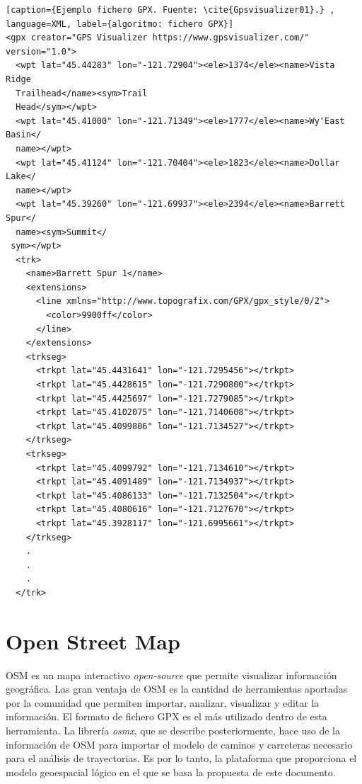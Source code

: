 \begin{lstlisting}[caption={Ejemplo fichero GPX. Fuente: \cite{Gpsvisualizer01}.} , 
language=XML, label={algoritmo: fichero GPX}]
<gpx creator="GPS Visualizer https://www.gpsvisualizer.com/" version="1.0">
  <wpt lat="45.44283" lon="-121.72904"><ele>1374</ele><name>Vista Ridge 
  Trailhead</name><sym>Trail 
  Head</sym></wpt>
  <wpt lat="45.41000" lon="-121.71349"><ele>1777</ele><name>Wy'East Basin</
  name></wpt>
  <wpt lat="45.41124" lon="-121.70404"><ele>1823</ele><name>Dollar Lake</
  name></wpt>
  <wpt lat="45.39260" lon="-121.69937"><ele>2394</ele><name>Barrett Spur</
  name><sym>Summit</
 sym></wpt>
  <trk>
    <name>Barrett Spur 1</name>
    <extensions>
      <line xmlns="http://www.topografix.com/GPX/gpx_style/0/2">
        <color>9900ff</color>
      </line>
    </extensions>
    <trkseg>
      <trkpt lat="45.4431641" lon="-121.7295456"></trkpt>
      <trkpt lat="45.4428615" lon="-121.7290800"></trkpt>
      <trkpt lat="45.4425697" lon="-121.7279085"></trkpt>
      <trkpt lat="45.4102075" lon="-121.7140608"></trkpt>
      <trkpt lat="45.4099806" lon="-121.7134527"></trkpt>
    </trkseg>
    <trkseg>
      <trkpt lat="45.4099792" lon="-121.7134610"></trkpt>
      <trkpt lat="45.4091489" lon="-121.7134937"></trkpt>
      <trkpt lat="45.4086133" lon="-121.7132504"></trkpt>
      <trkpt lat="45.4080616" lon="-121.7127670"></trkpt>
      <trkpt lat="45.3928117" lon="-121.6995661"></trkpt>
    </trkseg>
    .
    .
    .
  </trk>

\end{lstlisting}

\section{Open Street Map}
\ac{OSM} es un mapa interactivo \textit{open-source} que permite visualizar 
información geográfica. Las gran ventaja de \ac{OSM} es la cantidad de herramientas 
aportadas por la comunidad que permiten importar, analizar, visualizar y editar la 
información. El formato de fichero \ac{GPX} es el más utilizado dentro de esta 
herramienta. La librería \textit{osmx}, que se describe posteriormente, hace uso de la 
información de \ac{OSM} para importar el modelo de caminos y carreteras necesario 
para el análisis de trayectorias. Es por lo tanto, la plataforma que proporciona el modelo 
geoespacial lógico en el que se basa la propuesta de este documento.